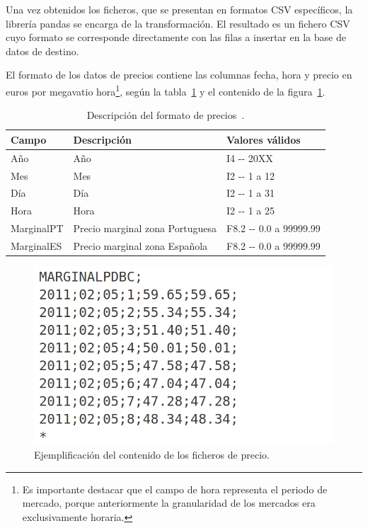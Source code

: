 Una vez obtenidos los ficheros, que se presentan en formatos CSV específicos, la librería pandas se encarga de la transformación. El resultado es un fichero CSV cuyo formato se corresponde directamente con las filas a insertar en la base de datos de destino.

El formato de los datos de precios contiene las columnas fecha, hora y precio en euros por megavatio hora\footnote{Es importante destacar que el campo de hora representa el periodo de mercado, porque anteriormente la granularidad de los mercados era exclusivamente horaria.}, según la tabla~\ref{tab:descripción-precio} y el contenido de la figura~\ref{fig:contenido-precio}.

\begin{table}[ht]
  \centering
  \begin{tabular}{|l|p{7.5cm}|l|}
    \hline
    Campo      & Descripción                     & Valores válidos            \\
    \hline
    Año        & Año                             & I4 {-}{-} 20XX             \\
    Mes        & Mes                             & I2 {-}{-} 1 a 12           \\
    Día        & Día                             & I2 {-}{-} 1 a 31           \\
    Hora       & Hora                            & I2 {-}{-} 1 a 25           \\
    MarginalPT & Precio marginal zona Portuguesa & F8.2 {-}{-} 0.0 a 99999.99 \\
    MarginalES & Precio marginal zona Española   & F8.2 {-}{-} 0.0 a 99999.99 \\
    \hline
  \end{tabular}
  \caption[Descripción del formato de precios.]{Descripción del formato de precios~\cite{omie2025modelo}.}%
  \label{tab:descripción-precio}
\end{table}

\begin{figure}
  \centering
  \includegraphics[width=0.5\linewidth]{figures/contenido-precio.png}
  \caption[Ejemplificación del contenido de los ficheros de precio.]{Ejemplificación del contenido de los ficheros de precio.}%
  \label{fig:contenido-precio}
\end{figure}

